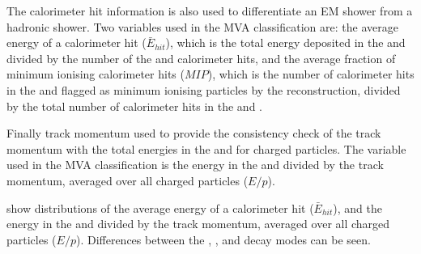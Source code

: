 The calorimeter hit information is also used to  differentiate an EM shower from a hadronic shower. Two variables used in the MVA classification are: the average energy of a calorimeter hit ($\bar{E}_{hit}$), which is the total energy deposited in the \ECAL and \HCAL divided by the number of the \ECAL and \HCAL calorimeter hits, and the average fraction of minimum ionising calorimeter hits ($MIP$), which is the number of calorimeter hits in the \ECAL and \HCAL flagged as minimum ionising particles by the \pandora reconstruction, divided by the total number of calorimeter hits in the \ECAL and \HCAL.

Finally track momentum used to provide the consistency check of the track momentum with the total energies in the \ECAL and \HCAL for charged particles. The variable used in the MVA classification is the energy in the \ECAL and \HCAL divided by the track momentum, averaged over all charged particles ($E/p$).


 show distributions of the average energy of a calorimeter hit ($\bar{E}_{hit}$), and the energy in the \ECAL and \HCAL divided by the track momentum, averaged over all charged particles ($E/p$). Differences between the \decayElectron, \decayMuon, and \decayPion decay modes can be seen.





